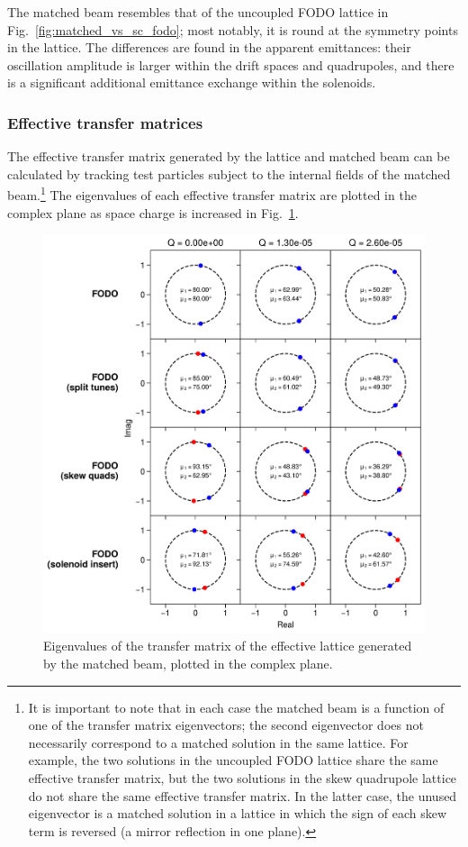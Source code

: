 %
The matched beam resembles that of the uncoupled FODO lattice in Fig.~\ref{fig:matched_vs_sc_fodo}; most notably, it is round at the symmetry points in the lattice. The differences are found in the apparent emittances: their oscillation amplitude is larger within the drift spaces and quadrupoles, and there is a significant additional emittance exchange within the solenoids. 


\subsubsection{Effective transfer matrices}

The effective transfer matrix generated by the lattice and matched beam can be calculated by tracking test particles subject to the internal fields of the matched beam.\footnote{It is important to note that in each case the matched beam is a function of one of the transfer matrix eigenvectors; the second eigenvector does not necessarily correspond to a matched solution in the same lattice. For example, the two solutions in the uncoupled FODO lattice share the same effective transfer matrix, but the two solutions in the skew quadrupole lattice do not share the same effective transfer matrix. In the latter case, the unused eigenvector is a matched solution in a lattice in which the sign of each skew term is reversed (a mirror reflection in one plane).} The eigenvalues of each effective transfer matrix are plotted in the complex plane as space charge is increased in Fig.~\ref{fig:effective_transfer_matrix_eigvals}.
%
\begin{figure}[!p]
    \centering
    \includegraphics[width=\textwidth]{Images/chapter2/eigvals.png}
    \caption{Eigenvalues of the transfer matrix of the effective lattice generated by the matched beam, plotted in the complex plane.}
    \label{fig:effective_transfer_matrix_eigvals}
\end{figure}
